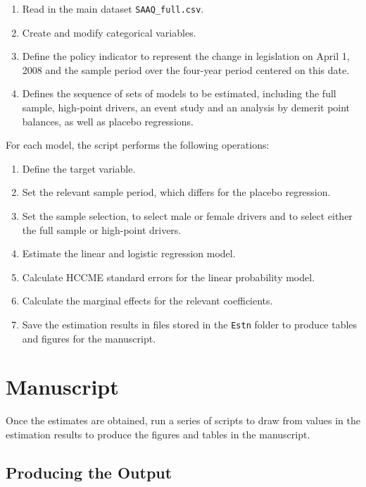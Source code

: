 \documentclass[11pt]{paper}
\begin{document}
\begin{enumerate}

\item  Read in the main dataset \texttt{SAAQ\_full.csv}.
\item  Create and modify categorical variables.
\item  Define the policy indicator
    to represent the change in legislation on April 1, 2008
    and the sample period 
    over the four-year period centered on this date. 
\item  Defines the sequence of sets of models to be estimated, 
    including the full sample, high-point drivers, 
    an event study and an analysis by demerit point balances,
    as well as placebo regressions. 

\end{enumerate}


For each model, the script performs the following operations: 

\begin{enumerate}

\item  Define the target variable. 
\item  Set the relevant sample period, 
    which differs for the placebo regression.
\item  Set the sample selection, 
    to select male or female drivers
    and to select either the full sample or high-point drivers.
\item  Estimate the linear and logistic regression model. 
\item  Calculate HCCME standard errors 
    for the linear probability model. 
\item  Calculate the marginal effects for the relevant coefficients. 
\item  Save the estimation results in files stored in the
    \texttt{Estn} folder to produce tables and figures 
    for the manuscript. 

\end{enumerate}



\section*{Manuscript}


Once the estimates are obtained, 
run a series of scripts 
to draw from values in the estimation
results to produce the figures and tables in the manuscript. 

\subsection*{Producing the Output}
\end{document}
